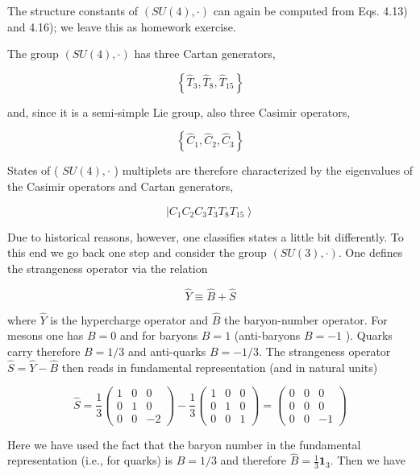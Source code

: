\documentclass[10pt, letterpaper]{article}
\begin{document}
The structure constants of $(S U(4), \cdot)$ can again be computed from Eqs. 4.13) and 4.16); we leave this as homework exercise.

The group $(S U(4), \cdot)$ has three Cartan generators,

$$
\left\{\hat{T}_{3}, \hat{T}_{8}, \hat{T}_{15}\right\}
$$

and, since it is a semi-simple Lie group, also three Casimir operators,

$$
\left\{\hat{C}_{1}, \hat{C}_{2}, \hat{C}_{3}\right\}
$$

States of ( $S U(4), \cdot$ ) multiplets are therefore characterized by the eigenvalues of the Casimir operators and Cartan generators,

$$
\left|C_{1} C_{2} C_{3} T_{3} T_{8} T_{15}\right\rangle
$$

Due to historical reasons, however, one classifies states a little bit differently. To this end we go back one step and consider the group $(S U(3), \cdot)$. One defines the strangeness operator via the relation

$$
\hat{Y} \equiv \hat{B}+\hat{S}
$$

where $\hat{Y}$ is the hypercharge operator and $\hat{B}$ the baryon-number operator. For mesons one has $B=0$ and for baryons $B=1$ (anti-baryons $B=-1$ ). Quarks carry therefore $B=1 / 3$ and anti-quarks $B=-1 / 3$. The strangeness operator $\hat{S}=\hat{Y}-\hat{B}$ then reads in fundamental representation (and in natural units)

$$
\hat{S}=\frac{1}{3}\left(\begin{array}{ccc}
1 & 0 & 0 \\
0 & 1 & 0 \\
0 & 0 & -2
\end{array}\right)-\frac{1}{3}\left(\begin{array}{ccc}
1 & 0 & 0 \\
0 & 1 & 0 \\
0 & 0 & 1
\end{array}\right)=\left(\begin{array}{ccc}
0 & 0 & 0 \\
0 & 0 & 0 \\
0 & 0 & -1
\end{array}\right)
$$

Here we have used the fact that the baryon number in the fundamental representation (i.e., for quarks) is $B=1 / 3$ and therefore $\hat{B}=\frac{1}{3} \mathbf{1}_{3}$. Then we have
\end{document}
